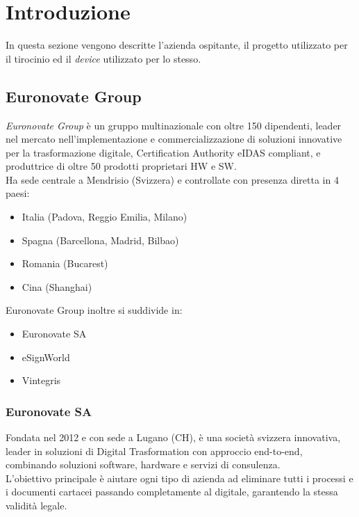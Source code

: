\chapter{Introduzione}
\label{cap:introduzione}





In questa sezione vengono descritte l'azienda ospitante, il progetto utilizzato per il tirocinio ed il \emph{device} utilizzato per lo stesso.

\section{Euronovate Group}

\emph{Euronovate Group} è un gruppo multinazionale con oltre 150 dipendenti, leader nel mercato
nell'implementazione e commercializzazione di soluzioni innovative per la trasformazione digitale,
Certification Authority eIDAS compliant, e produttrice di oltre 50 prodotti proprietari HW e
SW.\\
Ha sede centrale a Mendrisio (Svizzera) e controllate con presenza diretta in 4 paesi:
\begin{itemize}
    \item Italia (Padova, Reggio Emilia, Milano)
    \item Spagna (Barcellona, Madrid, Bilbao)
    \item Romania (Bucarest)
    \item Cina (Shanghai)
\end{itemize}
Euronovate Group inoltre si suddivide in:
\begin{itemize}
    \item Euronovate SA
    \item eSignWorld
    \item Vintegris
\end{itemize}
\subsection{Euronovate SA}
Fondata nel 2012 e con sede a Lugano (CH), è una società svizzera innovativa, leader in soluzioni
di Digital Trasformation con approccio end-to-end, combinando soluzioni software, hardware
e servizi di consulenza.\\
L'obiettivo principale è aiutare ogni tipo di azienda ad eliminare tutti i processi e i documenti
cartacei passando completamente al digitale, garantendo la stessa validità legale.
